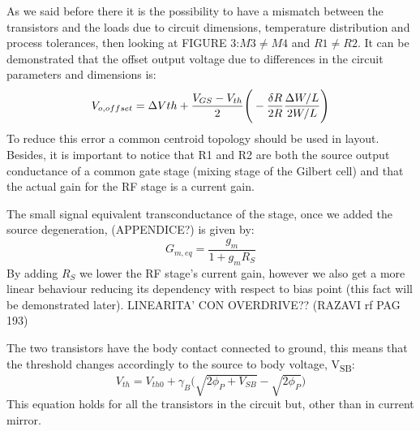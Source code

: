 As we said before there it is the possibility to have a mismatch between the transistors and the loads due to circuit dimensions, temperature distribution and process tolerances, then looking at FIGURE 3:$M3 \neq M4$ and $R1 \neq R2$. It can be demonstrated that the offset output voltage due to differences in the circuit parameters and dimensions is:
\begin{equation}
V_{o,offset}= \Delta V{th}+\frac{V_{GS}-V_{th}}{2}\Bigg(-\frac{\delta R}{2R}\frac{\Delta W /L}{2W/L}\Bigg) \notag
\end{equation}
To reduce this error a common centroid topology should be used in layout.
Besides, it is important to notice that R1 and R2 are both the source output conductance of a common gate stage (mixing stage of the Gilbert cell) and that the actual gain for the RF stage is a current gain. 

The small signal equivalent transconductance of the stage, once we added the source degeneration, (APPENDICE?) is given by:
\begin{equation}
\label{eq_degenGain}
G_{m,eq} = \frac{g_m}{1+g_m R_S}
\end{equation}
By adding $R_S$ we lower the RF stage's current gain, however  we also get a more linear behaviour reducing its dependency with respect to bias point (this fact will be demonstrated later). LINEARITA' CON OVERDRIVE?? (RAZAVI rf PAG 193)

The two transistors have the body contact connected to ground, this means that the threshold changes accordingly to the source to body voltage, V\textsubscript{SB}:
\begin{equation}
\label{eq_thresholdV}
V_{th} = V_{th0}+\gamma_B\big(\sqrt{2\phi_P + V_{SB}}-\sqrt{2\phi_P}\big)
\end{equation}
This equation holds for all the transistors in the circuit but, other than in current mirror.

